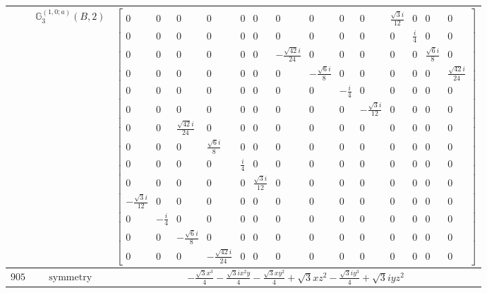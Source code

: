 \documentclass[fleqn,8pt,landscape]{jsarticle}
\begin{document}
\begin{longtable}{ccc}
$  $ & $ \mathbb{G}_{3}^{(1,0;a)}(B,2) $ & $ \begin{bmatrix} 0 & 0 & 0 & 0 & 0 & 0 & 0 & 0 & 0 & 0 & \frac{\sqrt{3} i}{12} & 0 & 0 & 0 \\ 0 & 0 & 0 & 0 & 0 & 0 & 0 & 0 & 0 & 0 & 0 & \frac{i}{4} & 0 & 0 \\ 0 & 0 & 0 & 0 & 0 & 0 & - \frac{\sqrt{42} i}{24} & 0 & 0 & 0 & 0 & 0 & \frac{\sqrt{6} i}{8} & 0 \\ 0 & 0 & 0 & 0 & 0 & 0 & 0 & - \frac{\sqrt{6} i}{8} & 0 & 0 & 0 & 0 & 0 & \frac{\sqrt{42} i}{24} \\ 0 & 0 & 0 & 0 & 0 & 0 & 0 & 0 & - \frac{i}{4} & 0 & 0 & 0 & 0 & 0 \\ 0 & 0 & 0 & 0 & 0 & 0 & 0 & 0 & 0 & - \frac{\sqrt{3} i}{12} & 0 & 0 & 0 & 0 \\ 0 & 0 & \frac{\sqrt{42} i}{24} & 0 & 0 & 0 & 0 & 0 & 0 & 0 & 0 & 0 & 0 & 0 \\ 0 & 0 & 0 & \frac{\sqrt{6} i}{8} & 0 & 0 & 0 & 0 & 0 & 0 & 0 & 0 & 0 & 0 \\ 0 & 0 & 0 & 0 & \frac{i}{4} & 0 & 0 & 0 & 0 & 0 & 0 & 0 & 0 & 0 \\ 0 & 0 & 0 & 0 & 0 & \frac{\sqrt{3} i}{12} & 0 & 0 & 0 & 0 & 0 & 0 & 0 & 0 \\ - \frac{\sqrt{3} i}{12} & 0 & 0 & 0 & 0 & 0 & 0 & 0 & 0 & 0 & 0 & 0 & 0 & 0 \\ 0 & - \frac{i}{4} & 0 & 0 & 0 & 0 & 0 & 0 & 0 & 0 & 0 & 0 & 0 & 0 \\ 0 & 0 & - \frac{\sqrt{6} i}{8} & 0 & 0 & 0 & 0 & 0 & 0 & 0 & 0 & 0 & 0 & 0 \\ 0 & 0 & 0 & - \frac{\sqrt{42} i}{24} & 0 & 0 & 0 & 0 & 0 & 0 & 0 & 0 & 0 & 0 \end{bmatrix} $ \\ \hline
$ 905 $ & $ \text{symmetry} $ & $ - \frac{\sqrt{3} x^{3}}{4} - \frac{\sqrt{3} i x^{2} y}{4} - \frac{\sqrt{3} x y^{2}}{4} + \sqrt{3} x z^{2} - \frac{\sqrt{3} i y^{3}}{4} + \sqrt{3} i y z^{2} $ \\

\end{longtable}
\end{document}
